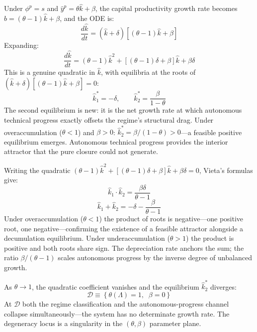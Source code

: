 Under $\phi^p = s$ and $\hat{y}^p = \theta\hat{k} + \beta$, the capital productivity growth rate becomes $\hat{b} = (\theta - 1)\hat{k} + \beta$, and the ODE is:
%
\begin{equation}\label{eq:extended_ode}
	\frac{d\hat{k}}{dt} = (\hat{k} + \delta)\left[(\theta - 1)\hat{k} + \beta\right]
\end{equation}
%
Expanding:
%
\begin{equation}\label{eq:quadratic_expanded}
	\frac{d\hat{k}}{dt} = (\theta - 1)\hat{k}^2 + \left[(\theta - 1)\delta + \beta\right]\hat{k} + \beta\delta
\end{equation}
%
This is a genuine quadratic in $\hat{k}$, with equilibria at the roots of $(\hat{k} + \delta)[(\theta - 1)\hat{k} + \beta] = 0$:
%
\begin{equation}\label{eq:extended_equilibria}
	\hat{k}_1^* = -\delta, \qquad \hat{k}_2^* = \frac{\beta}{1 - \theta}
\end{equation}
%
The second equilibrium is new: it is the net growth rate at which autonomous technical progress exactly offsets the regime's structural drag. Under overaccumulation ($\theta < 1$) and $\beta > 0$: $\hat{k}_2^* = \beta/(1 - \theta) > 0$---a feasible positive equilibrium emerges. Autonomous technical progress provides the interior attractor that the pure closure could not generate.

Writing the quadratic $(\theta - 1)\hat{k}^2 + [(\theta - 1)\delta + \beta]\hat{k} + \beta\delta = 0$, Vieta's formulas give:
%
\begin{equation}\label{eq:vieta_product}
	\hat{k}_1 \cdot \hat{k}_2 = \frac{\beta\delta}{\theta - 1}
\end{equation}
%
\begin{equation}\label{eq:vieta_sum}
	\hat{k}_1 + \hat{k}_2 = -\delta - \frac{\beta}{\theta - 1}
\end{equation}
%
Under overaccumulation ($\theta < 1$) the product of roots is negative---one positive root, one negative---confirming the existence of a feasible attractor alongside a decumulation equilibrium. Under underaccumulation ($\theta > 1$) the product is positive and both roots share sign. The depreciation rate anchors the sum; the ratio $\beta/(\theta - 1)$ scales autonomous progress by the inverse degree of unbalanced growth.

As $\theta \to 1$, the quadratic coefficient vanishes and the equilibrium $\hat{k}_2^*$ diverges:
%
\begin{equation}\label{eq:degeneracy}
	\mathcal{D} \equiv \left\{\theta(\Lambda) = 1,\;\; \beta = 0\right\}
\end{equation}
%
At $\mathcal{D}$ both the regime classification and the autonomous-progress channel collapse simultaneously---the system has no determinate growth rate. The degeneracy locus is a singularity in the $(\theta, \beta)$ parameter plane.

